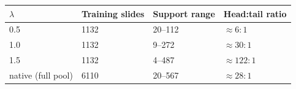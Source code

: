 \begin{tabular}{llll}
\toprule
$\lambda$ & Training slides & Support range & Head:tail ratio\\
\midrule
0.5 & 1132 & 20--112 & ${\approx}6{:}1$\\
1.0 & 1132 & 9--272 & ${\approx}30{:}1$\\
1.5 & 1132 & 4--487 & ${\approx}122{:}1$\\
native (full pool) & 6110 & 20--567 & ${\approx}28{:}1$\\
\bottomrule
\end{tabular}
